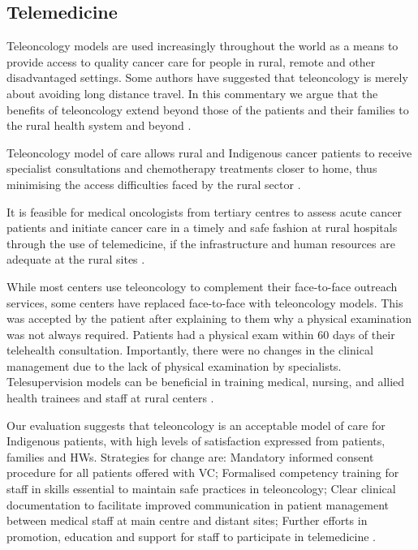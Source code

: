 \cite{the_shift_project_plan_2021}

\subsection{Telemedicine}

Teleoncology models are used increasingly throughout the world as a means to provide access to quality cancer care for people in rural, remote and other disadvantaged settings. Some authors have suggested that teleoncology is merely about avoiding long distance travel. In this commentary we argue that the benefits of teleoncology extend beyond those of the patients and their families to the rural health system and beyond \cite{sabesan_are_2014}.

Teleoncology model of care allows rural and Indigenous cancer patients to receive specialist consultations and chemotherapy treatments closer to home, thus minimising the access difficulties faced by the rural sector \cite{sabesan_telemedicine_2012}.

It is feasible for medical oncologists from tertiary centres to assess acute cancer patients and initiate cancer care in a timely and safe fashion at rural hospitals through the use of telemedicine, if the infrastructure and human resources are adequate at the rural sites \cite{sabesan_timely_2014}.

While most centers use teleoncology to complement their face-to-face outreach services, some centers have replaced face-to-face with teleoncology models. This was accepted by the patient after explaining to them why a physical examination was not always required. Patients had a physical exam within 60 days of their telehealth consultation. Importantly, there were no changes in the clinical management due to the lack of physical examination by specialists. Telesupervision models can be beneficial in training medical, nursing, and allied health trainees and staff at rural centers \cite{sabesan_medical_2014}.

Our evaluation suggests that teleoncology is an acceptable model of care for Indigenous patients, with high levels of satisfaction expressed from patients, families and HWs. Strategies for change are: Mandatory informed consent procedure for all patients offered with VC; Formalised competency training for staff in skills essential to maintain safe practices in teleoncology; Clear clinical documentation to facilitate improved communication in patient management between medical staff at main centre and distant sites; Further efforts in promotion, education and support for staff to participate in telemedicine \cite{mooi_teleoncology_2012}.

